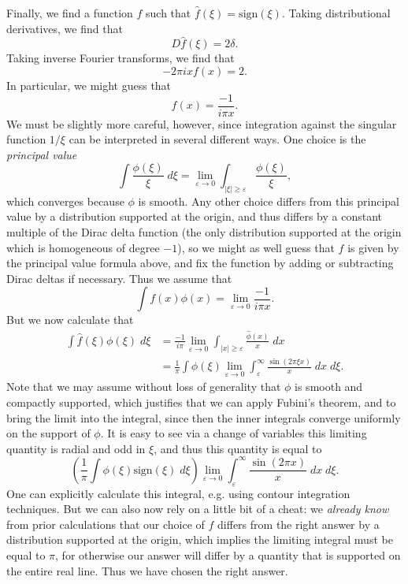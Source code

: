 \documentclass[answers]{exam}
\begin{document}
\begin{questions}
\begin{solution}
    Finally, we find a function $f$ such that $\widehat{f}(\xi) = \text{sign}(\xi)$. Taking distributional derivatives, we find that
    \[ D \widehat{f}(\xi) = 2 \delta. \]
    Taking inverse Fourier transforms, we find that
    \[ - 2 \pi i x f(x) = 2. \]
    In particular, we might guess that
    \[ f(x) = \frac{-1}{i \pi x}. \]
    We must be slightly more careful, however, since integration against the singular function $1/\xi$ can be interpreted in several different ways. One choice is the \emph{principal value}
    \[ \int \frac{\phi(\xi)}{\xi}\; d\xi = \lim_{\varepsilon \to 0} \int_{|\xi| \geq \varepsilon} \frac{\phi(\xi)}{\xi}, \]
    which converges because $\phi$ is smooth. Any other choice differs from this principal value by a distribution supported at the origin, and thus differs by a constant multiple of the Dirac delta function (the only distribution supported at the origin which is homogeneous of degree $-1$), so we might as well guess that $f$ is given by the principal value formula above, and fix the function by adding or subtracting Dirac deltas if necessary. Thus we assume that
    \[ \int f(x) \phi(x) = \lim_{\varepsilon \to 0} \frac{-1}{i \pi x}. \]
    But we now calculate that
    \begin{align*}
    	\int \widehat{f}(\xi) \phi(\xi)\; d\xi &= \frac{-1}{i \pi} \lim_{\varepsilon \to 0} \int_{|x| \geq \varepsilon} \frac{\widehat{\phi}(x)}{x}\; dx\\
    	&= \frac{1}{\pi} \int \phi(\xi) \lim_{\varepsilon \to 0} \int_\varepsilon^\infty \frac{\sin(2 \pi \xi x)}{x}\; dx\; d\xi.
    \end{align*}
    Note that we may assume without loss of generality that $\phi$ is smooth and compactly supported, which justifies that we can apply Fubini's theorem, and to bring the limit into the integral, since then the inner integrals converge uniformly on the support of $\phi$. It is easy to see via a change of variables this limiting quantity is radial and odd in $\xi$, and thus this quantity is equal to
    \[ \left( \frac{1}{\pi} \int \phi(\xi) \text{sign}(\xi)\; d\xi \right) \lim_{\varepsilon \to 0} \int_\varepsilon^\infty \frac{\sin(2 \pi x)}{x}\; dx\; d\xi. \]
    One can explicitly calculate this integral, e.g. using contour integration techniques. But we can also now rely on a little bit of a cheat: we \emph{already know} from prior calculations that our choice of $f$ differs from the right answer by a distribution supported at the origin, which implies the limiting integral must be equal to $\pi$, for otherwise our answer will differ by a quantity that is supported on the entire real line. Thus we have chosen the right answer.


\end{solution}
\end{questions}
\end{document}
